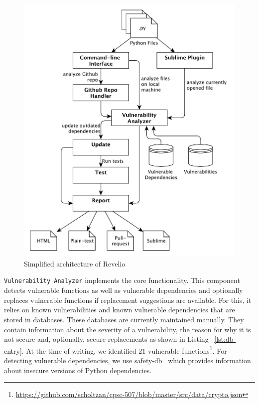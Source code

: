 \begin{figure}[!h]
\centering
\includegraphics[width=\linewidth]{"figures/architecture"}
\caption{Simplified architecture of Revelio}
\label{fig:architecture}
\end{figure}


\texttt{Vulnerability Analyzer} implements the core functionality. This component detects vulnerable functions as well as vulnerable dependencies and optionally replaces vulnerable functions if replacement suggestions are available. For this, it relies on known vulnerabilities and known vulnerable dependencies that are stored in databases. These databases are currently maintained manually. They contain information about the severity of a vulnerability, the reason for why it is not secure and, optionally, secure replacements as shown in Listing ~\ref{lst:db-entry}. At the time of writing, we identified 21 vulnerable functions\footnote{\url{https://github.com/scholtzan/cpsc-507/blob/master/src/data/crypto.json}}. For detecting vulnerable dependencies, we use safety-db~\cite{safetydb} which provides information about insecure versions of Python dependencies. 

